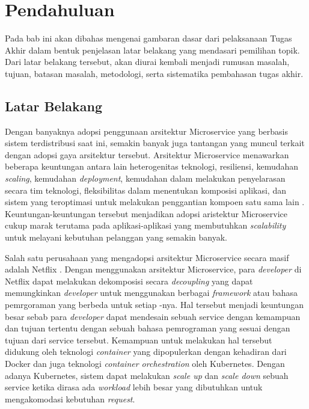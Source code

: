\chapter{Pendahuluan}

Pada bab ini akan dibahas mengenai gambaran dasar dari pelaksanaan Tugas Akhir dalam bentuk penjelasan latar belakang yang mendasari pemilihan topik. Dari latar belakang tersebut, akan diurai kembali menjadi rumusan masalah, tujuan, batasan masalah, metodologi, serta sistematika pembahasan tugas akhir.                                                                        

\section{Latar Belakang}
\label{ch1-latbel}


Dengan banyaknya adopsi penggunaan arsitektur Microservice yang berbasis sistem terdistribusi saat ini, semakin banyak juga tantangan yang muncul terkait dengan adopsi gaya arsitektur tersebut. Arsitektur Microservice menawarkan beberapa keuntungan antara lain heterogenitas teknologi, resiliensi, kemudahan \textit{scaling}, kemudahan \textit{deployment}, kemudahan dalam melakukan penyelarasan secara tim teknologi, fleksibilitas dalam menentukan komposisi aplikasi, dan sistem yang teroptimasi untuk melakukan penggantian kompoen satu sama lain \citep{building-microservices}. Keuntungan-keuntungan tersebut menjadikan adopsi aristektur Microservice cukup marak terutama pada aplikasi-aplikasi yang membutuhkan \textit{scalability} untuk melayani kebutuhan pelanggan yang semakin banyak.  


Salah satu perusahaan yang mengadopsi arsitektur Microservice secara masif adalah Netflix \citep{netflix-nginx, netflix-infoq}. Dengan menggunakan arsitektur Microservice, para \textit{developer} di Netflix dapat melakukan dekomposisi secara \textit{decoupling} yang dapat memungkinkan \textit{developer} untuk menggunakan berbagai \textit{framework} atau bahasa pemrgoraman yang berbeda untuk setiap \textitservice-nya. Hal tersebut menjadi keuntungan besar sebab para \textit{developer} dapat mendesain sebuah service dengan kemampuan dan tujuan tertentu dengan sebuah bahasa pemrograman yang sesuai dengan tujuan dari service tersebut. Kemampuan untuk melakukan hal tersebut didukung oleh teknologi \textit{container} yang dipopulerkan dengan kehadiran dari Docker dan juga teknologi \textit{container orchestration} oleh Kubernetes. Dengan adanya Kubernetes, sistem dapat melakukan \textit{scale up} dan \textit{scale down} sebuah service ketika dirasa ada \textit{workload} lebih besar yang dibutuhkan untuk mengakomodasi kebutuhan \textit{request}.

